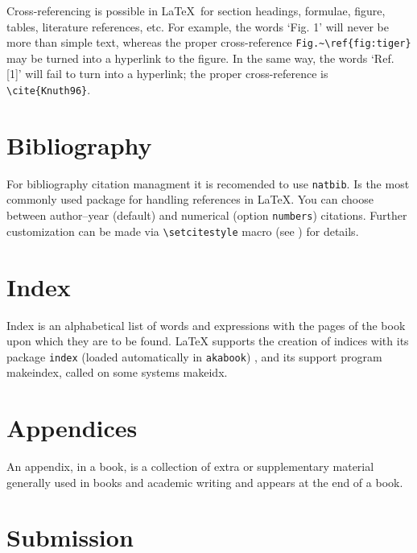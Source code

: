 \documentclass{ltxdoc}
\def\file#1{\texttt{#1}}
\begin{document}
Cross-referencing is possible in \LaTeX\ for section headings, formulae, figure, tables, 
literature references, etc. For example, the words `Fig. 1' will never be more than simple 
text, whereas the proper cross-reference \verb!Fig.~\ref{fig:tiger}! may be turned into a 
hyperlink to the figure. In the same way, the words `Ref. [1]' will fail to turn into a 
hyperlink; the proper cross-reference is \verb!\cite{Knuth96}!.


\section{Bibliography}

For bibliography citation managment it is recomended to use \file{natbib}.
Is the most commonly used package for handling references in LaTeX.
You can choose between author--year (default) and numerical (option \verb!numbers!) citations.
Further customization 
can be made via \verb!\setcitestyle! macro (see \cite{ref:natbib}) for details.

\section{Index}

Index is an alphabetical list of words and 
expressions with the pages of the book upon which they are to be found. 
LaTeX supports the creation of indices with its package \file{index} (loaded automatically in \file{akabook}) \cite{ref:index}, 
and its support program makeindex, called on some systems makeidx.


\section{Appendices}

An appendix, in a book, is a collection of extra or supplementary material 
generally used in books and academic writing and appears at the end of a book.
 


\newpage
\section{Submission}
\end{document}
